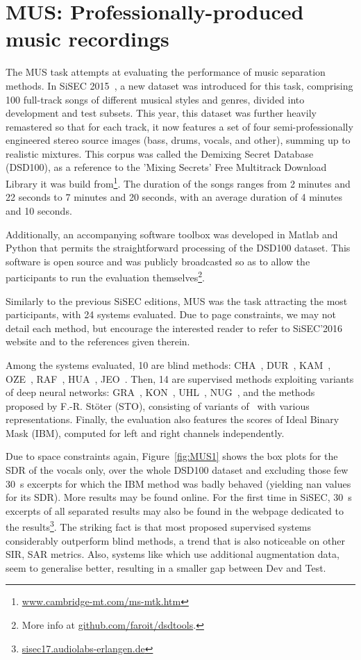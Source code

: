 
\section{MUS: Professionally-produced music recordings}\label{sec:MUS}


The MUS task attempts at evaluating the performance of music separation methods. In SiSEC 2015~\cite{SiSEC2015}, a new dataset was introduced for this task, comprising 100 full-track songs of different musical styles and genres, divided into development and test subsets. This year, this dataset was further heavily remastered so that for each track, it now features a set of four semi-professionally engineered stereo source images (bass, drums, vocals, and other), summing up to realistic mixtures. This corpus was called the Demixing Secret Database (DSD100), as a reference to the 'Mixing Secrets' Free Multitrack Download Library it was build from\footnote{\url{www.cambridge-mt.com/ms-mtk.htm}}. The duration of the songs ranges from 2 minutes and 22 seconds to 7 minutes and 20 seconds, with an average duration of 4 minutes and 10 seconds.

Additionally, an accompanying software toolbox was developed in Matlab and Python that permits the straightforward processing of the DSD100 dataset. This software  is open source and was publicly broadcasted so as to allow the participants to run the evaluation themselves\footnote{More info at \url{github.com/faroit/dsdtools}.}.

Similarly to the previous SiSEC editions, MUS was the task attracting the most participants, with 24 systems evaluated. Due to page constraints, we may not detail each method, but encourage the interested reader to refer to SiSEC'2016 website and to the references given therein.

Among the systems evaluated, 10 are blind methods:
CHA~\cite{chan15}, DUR~\cite{durrieu11}, KAM~\cite{liutkus15}, OZE~\cite{ozerov12}, RAF~\cite{rafii12,liutkus12,rafii13}, HUA~\cite{huang12}, JEO~\cite{JEO}. Then, 14 are supervised methods exploiting variants of deep neural networks: GRA~\cite{GRA}, KON~\cite{KON}, UHL~\cite{UHL}, NUG~\cite{NUG}, and the methods proposed by F.-R. St\"oter (STO), consisting of variants of~\cite{UHL,commonfate} with various representations. Finally, the evaluation also features the scores of Ideal Binary Mask (IBM), computed for left and right channels independently.

Due to space constraints again, Figure~\ref{fig:MUS1} shows the box plots for the SDR of the vocals only, over the whole DSD100 dataset and excluding those few 30~s excerpts for which the IBM method was badly behaved (yielding nan values for its SDR). More results may be found online. For the first time in SiSEC, 30~s excerpts of all separated results may also be found in the webpage dedicated to the results\footnote{\url{sisec17.audiolabs-erlangen.de}}. The striking fact is that most proposed supervised systems considerably outperform blind methods, a trend that is also noticeable on other SIR, SAR metrics. Also, systems like \cite{UHL} which use additional augmentation data, seem to generalise better, resulting in a smaller gap between Dev and Test.

